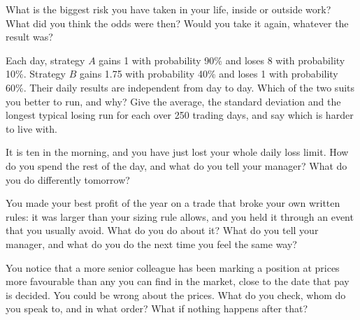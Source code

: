 \begin{question}\label{iq:iv2:behavioural-and-fit:25}
What is the biggest risk you have taken in your life, inside or outside work? What did you think the odds were then? Would you take it again, whatever the result was?
\end{question}

\begin{question}\label{iq:iv2:behavioural-and-fit:26}
Each day, strategy $A$ gains 1 with probability 90\% and loses 8 with probability 10\%. Strategy $B$ gains 1.75 with probability 40\% and loses 1 with probability 60\%. Their daily results are independent from day to day. Which of the two suits you better to run, and why? Give the average, the standard deviation and the longest typical losing run for each over 250 trading days, and say which is harder to live with.
\end{question}

\begin{question}\label{iq:iv2:behavioural-and-fit:27}
It is ten in the morning, and you have just lost your whole daily loss limit. How do you spend the rest of the day, and what do you tell your manager? What do you do differently tomorrow?
\end{question}

\begin{question}\label{iq:iv2:behavioural-and-fit:28}
You made your best profit of the year on a trade that broke your own written rules: it was larger than your sizing rule allows, and you held it through an event that you usually avoid. What do you do about it? What do you tell your manager, and what do you do the next time you feel the same way?
\end{question}

\begin{question}\label{iq:iv2:behavioural-and-fit:29}
You notice that a more senior colleague has been marking a position at prices more favourable than any you can find in the market, close to the date that pay is decided. You could be wrong about the prices. What do you check, whom do you speak to, and in what order? What if nothing happens after that?
\end{question}

